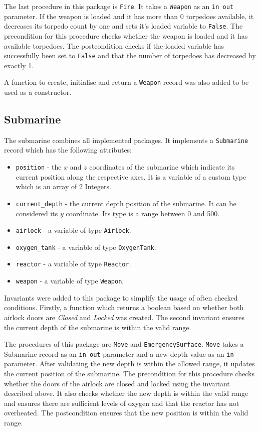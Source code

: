 \documentclass{llncs}
\begin{document}
The last procedure in this package is \texttt{Fire}. It takes a \texttt{Weapon} as an \texttt{in out} parameter. If the weapon is loaded and it has more than 0 torpedoes available, it decreases its torpedo count by one and sets it's loaded variable to \texttt{False}. The precondition for this procedure checks whether the weapon is loaded and it has available torpedoes. The postcondition checks if the loaded variable has successfully been set to \texttt{False} and that the number of torpedoes has decreased by exactly 1.

A function to create, initialise and return a \texttt{Weapon} record was also added to be used as a constructor.

\subsection{Submarine}
The submarine combines all implemented packages. It implements a \texttt{Submarine} record which has the following attributes:
\begin{itemize}
	\item \texttt{position} - the $x$ and $z$ coordinates of the submarine which indicate its current position along the respective axes. It is a variable of a custom type which is an array of 2 Integers.
	\item \texttt{current\_depth} - the current depth position of the submarine. It can be considered its $y$ coordinate. Its type is a range between 0 and 500.
	\item \texttt{airlock} - a variable of type \texttt{Airlock}.
	\item \texttt{oxygen\_tank} - a variable of type \texttt{OxygenTank}.
	\item \texttt{reactor} - a variable of type \texttt{Reactor}.
	\item \texttt{weapon} - a variable of type \texttt{Weapon}.
\end{itemize}

Invariants were added to this package to simplify the usage of often checked conditions. Firstly, a function which returns a boolean based on whether both airlock doors are \textit{Closed} and \textit{Locked} was created. The second invariant ensures  the current depth of the submarine is within the valid range.

The procedures of this package are \texttt{Move} and \texttt{EmergencySurface}. 
\texttt{Move} takes a Submarine record as an \texttt{in out} parameter and a new depth value as an \texttt{in} parameter. After validating the new depth is within the allowed range, it updates the current position of the submarine. The precondition for this procedure checks whether the doors of the airlock are closed and locked using the invariant described above. It also checks whether the new depth is within the valid range and ensures there are sufficient levels of oxygen and that the reactor has not overheated. The postcondition ensures that the new position is within the valid range.
\end{document}
